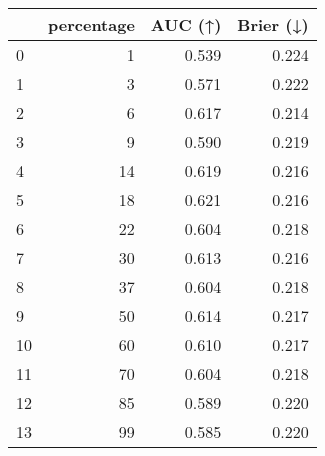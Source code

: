\begin{tabular}{lrrr}
\toprule
 & percentage & AUC (↑) & Brier (↓) \\
\midrule
0 & 1 & 0.539 & 0.224 \\
1 & 3 & 0.571 & 0.222 \\
2 & 6 & 0.617 & 0.214 \\
3 & 9 & 0.590 & 0.219 \\
4 & 14 & 0.619 & 0.216 \\
5 & 18 & 0.621 & 0.216 \\
6 & 22 & 0.604 & 0.218 \\
7 & 30 & 0.613 & 0.216 \\
8 & 37 & 0.604 & 0.218 \\
9 & 50 & 0.614 & 0.217 \\
10 & 60 & 0.610 & 0.217 \\
11 & 70 & 0.604 & 0.218 \\
12 & 85 & 0.589 & 0.220 \\
13 & 99 & 0.585 & 0.220 \\
\bottomrule
\end{tabular}
